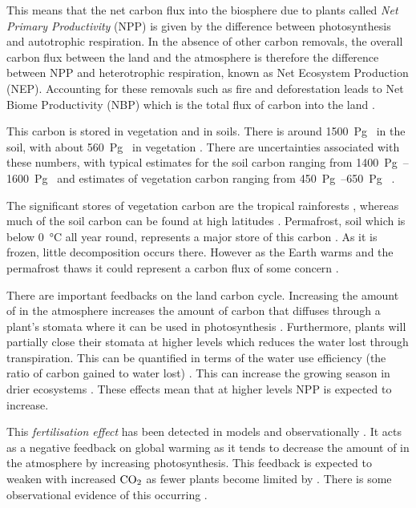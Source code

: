 This means that the net carbon flux into the biosphere due to plants called \emph{Net Primary Productivity} (NPP) is given by the difference between photosynthesis and
autotrophic respiration. In the absence of other carbon removals, the overall carbon flux between the land and the atmosphere is therefore the
difference between NPP and heterotrophic respiration, known as Net Ecosystem Production (NEP). Accounting for these removals such as fire and deforestation leads to
Net Biome Productivity (NBP) which is the total flux of carbon into the land \parencite{Lovett2006,Fernandez-Martinez2023}. 

This carbon is stored in vegetation and in soils. There is around \SI{1500}{\peta\gram\carbon} in the soil, with about \SI{560}{\peta\gram\carbon} in vegetation \parencite{Crowther2019}.
There are uncertainties associated with these numbers, with typical estimates for the soil carbon ranging from \SIrange{1400}{1600}{\peta\gram\carbon} \parencite{Batjes2016} and
estimates of vegetation carbon ranging from \SIrange{450}{650}{\peta\gram\carbon} \parencite{Ciais2013}.

The significant stores of vegetation carbon are the tropical rainforests \parencite{Malhi2006}, whereas much of the soil carbon can be found at high latitudes \parencite{Varney2020}.
Permafrost, soil which is below \SI{0}{\degreeCelsius} all year round, represents a major store of this carbon \parencite{Hugelius2014}. As it is frozen, little decomposition occurs there.
However as the Earth warms and the permafrost thaws it could represent a carbon flux of some concern \parencite{Schuur2015}.


There are important feedbacks on the land carbon cycle.
Increasing the amount of  in the atmosphere increases the amount of carbon that diffuses through a plant's stomata where it can be used in photosynthesis \parencite{Farquhar1980}.
Furthermore, plants will partially close their stomata at higher  levels \parencite{DeKauwe2013} which reduces the water lost through transpiration. This can be quantified in terms of the
water use efficiency (the ratio of carbon gained to water lost) \parencite{Drake1997}. This can increase the growing season in drier ecosystems \parencite{Frank2015}.
These effects mean that at higher  levels NPP is expected to increase.

This \emph{ fertilisation effect} has been detected in models \parencite{Friedlingstein2006,Arora2020,Wenzel2016} and observationally \parencite{Ainsworth2007,KolbySmith2016}.
It acts as a negative feedback on global warming as it tends to decrease the amount of  in the atmosphere by increasing photosynthesis. This feedback is
expected to weaken with increased $\ce{CO2}$ as fewer plants become limited by . There is some observational evidence of this occurring \parencite{Wang2020}.

